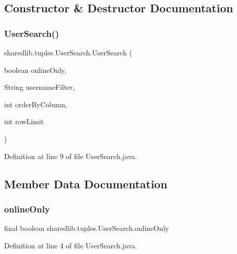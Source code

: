 \subsection{Constructor \& Destructor Documentation}
\hypertarget{classsharedlib_1_1tuples_1_1_user_search_a0cb2fe1c24c61631c62589299b655c1a}{}\label{classsharedlib_1_1tuples_1_1_user_search_a0cb2fe1c24c61631c62589299b655c1a} 
\subsubsection{\texorpdfstring{User\+Search()}{UserSearch()}}
{\footnotesize\ttfamily sharedlib.\+tuples.\+User\+Search.\+User\+Search (\begin{DoxyParamCaption}\item[{boolean}]{online\+Only,  }\item[{String}]{username\+Filter,  }\item[{int}]{order\+By\+Column,  }\item[{int}]{row\+Limit }\end{DoxyParamCaption})}



Definition at line 9 of file User\+Search.\+java.



\subsection{Member Data Documentation}
\hypertarget{classsharedlib_1_1tuples_1_1_user_search_a49ca772236a9c2d8726d9c119645170c}{}\label{classsharedlib_1_1tuples_1_1_user_search_a49ca772236a9c2d8726d9c119645170c} 
\subsubsection{\texorpdfstring{online\+Only}{onlineOnly}}
{\footnotesize\ttfamily final boolean sharedlib.\+tuples.\+User\+Search.\+online\+Only}



Definition at line 4 of file User\+Search.\+java.

